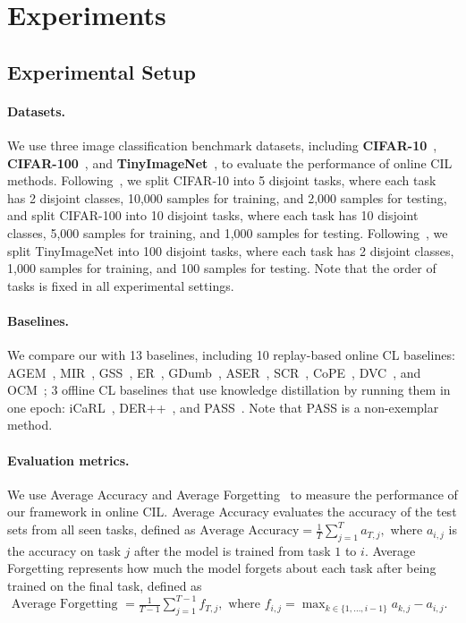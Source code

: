 



\section{Experiments}
\subsection{Experimental Setup}
\paragraph{Datasets.}
We use three image classification benchmark datasets, including \textbf{CIFAR-10}~\cite{cifar10_100}, \textbf{CIFAR-100}~\cite{cifar10_100}, and \textbf{TinyImageNet}~\cite{tinyImageNet}, to evaluate the performance of online CIL methods. 
Following~\cite{ASER, SCR, DVC}, we split CIFAR-10 into 5 disjoint tasks, where each task has 2 disjoint classes, 10,000 samples for training, and 2,000 samples for testing, and split CIFAR-100 into 10 disjoint tasks, where each task has 10 disjoint classes, 5,000 samples for training, and 1,000 samples for testing.
Following~\cite{OCM}, we split TinyImageNet into 100 disjoint tasks, where each task has 2 disjoint classes, 1,000 samples for training, and 100 samples for testing.
Note that the order of tasks is fixed in all experimental settings.

\paragraph{Baselines.}
We compare our \frameworkName with 13 baselines, including 10 replay-based online CL baselines: {AGEM}~\cite{AGEM}, {MIR}~\cite{MIR}, {GSS}~\cite{GSS}, {ER}~\cite{ER}, {GDumb}~\cite{GDumb}, {ASER}~\cite{ASER}, {SCR}~\cite{SCR}, {CoPE}~\cite{online_pro_ema}, {DVC}~\cite{DVC}, and {OCM}~\cite{OCM}; 3 offline CL baselines that use knowledge distillation by running them in one epoch: {iCaRL}~\cite{iCaRL}, {DER++}~\cite{DER++}, and PASS~\cite{protoAug}. Note that PASS is a non-exemplar method.

\paragraph{Evaluation metrics.}
We use Average Accuracy and Average Forgetting~\cite{ASER, DVC} to measure the performance of our framework in online CIL. Average Accuracy evaluates the accuracy of the test sets from all seen tasks, defined as $\text {Average Accuracy} =\frac{1}{T} \sum_{j=1}^T a_{T, j},$
where $a_{i, j}$ is the accuracy on task $j$ after the model is trained from task $1$ to $i$.
Average Forgetting represents how much the model forgets about each task after being trained on the final task, defined as
$\text { Average Forgetting } =\frac{1}{T-1} \sum_{j=1}^{T-1} f_{T, j}, 
\text { where } f_{i, j}=\max _{k \in\{1, \ldots, i-1\}} a_{k, j}-a_{i, j}.$

